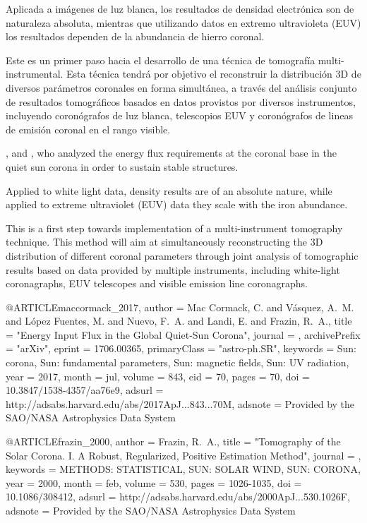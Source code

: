
Aplicada a imágenes de luz blanca, los resultados de densidad electrónica son de naturaleza absoluta, mientras que utilizando datos en extremo ultravioleta (EUV) los resultados dependen de la abundancia de hierro coronal.

Este es un primer paso hacia el desarrollo de una técnica de tomografía multi-instrumental. Esta técnica tendrá por objetivo el reconstruir la distribución 3D de diversos parámetros coronales en forma simultánea, a través del análisis conjunto de resultados tomográficos basados en datos provistos por diversos instrumentos, incluyendo coronógrafos de luz blanca, telescopios EUV y coronógrafos de lineas de emisión coronal en el rango visible.
 

, and \citet{maccormack_2017}, who analyzed the energy flux requirements at the coronal base in the quiet sun corona in order to sustain stable structures. 

Applied to white light data, density results are of an absolute nature, while applied to extreme ultraviolet (EUV) data they scale with the iron abundance.
  
This is a first step towards implementation of a multi-instrument tomography technique. This method will aim at simultaneously reconstructing the 3D distribution of different coronal parameters through joint analysis of tomographic results based on data provided by multiple instruments, including white-light coronagraphs, EUV telescopes and visible emission line coronagraphs.


@ARTICLE{maccormack_2017,
   author = {{Mac Cormack}, C. and {V{\'a}squez}, A.~M. and {L{\'o}pez Fuentes}, M. and 
	{Nuevo}, F.~A. and {Landi}, E. and {Frazin}, R.~A.},
    title = "{Energy Input Flux in the Global Quiet-Sun Corona}",
  journal = {\apj},
archivePrefix = "arXiv",
   eprint = {1706.00365},
 primaryClass = "astro-ph.SR",
 keywords = {Sun: corona, Sun: fundamental parameters, Sun: magnetic fields, Sun: UV radiation},
     year = 2017,
    month = jul,
   volume = 843,
      eid = {70},
    pages = {70},
      doi = {10.3847/1538-4357/aa76e9},
   adsurl = {http://adsabs.harvard.edu/abs/2017ApJ...843...70M},
  adsnote = {Provided by the SAO/NASA Astrophysics Data System}
}

@ARTICLE{frazin_2000,
   author = {{Frazin}, R.~A.},
    title = "{Tomography of the Solar Corona. I. A Robust, Regularized, Positive Estimation Method}",
  journal = {\apj},
 keywords = {METHODS: STATISTICAL, SUN: SOLAR WIND, SUN: CORONA},
     year = 2000,
    month = feb,
   volume = 530,
    pages = {1026-1035},
      doi = {10.1086/308412},
   adsurl = {http://adsabs.harvard.edu/abs/2000ApJ...530.1026F},
  adsnote = {Provided by the SAO/NASA Astrophysics Data System}
}
